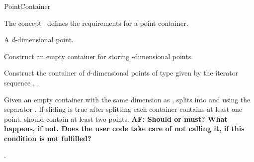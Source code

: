 

\begin{ccRefConcept}{PointContainer}


\begin{ccAdvanced}

\ccDefinition
  
The concept \ccRefName\ defines the requirements for
a point container. 


\ccTypes

 { A $d$-dimensional point.}
\ccCreation
{}  %

{
Construct an empty container for storing -dimensional points.
}

{
Construct the container of $d$-dimensional points of type 
given by the iterator sequence , .
}

\ccOperations

{Given an empty container  with the same dimension as , splits  into
 and  using the separator . If sliding is true after splitting 
each container contains at least one point.  should contain at least two points.
{\bf AF: Should or must? What happens, if not. Does the user code take care of not calling
it, if this condition is not fulfilled?}}

\ccHasModels

.

\ccSeeAlso

\\
\\

\end{ccAdvanced}
\end{ccRefConcept}


